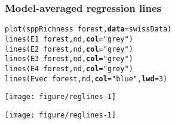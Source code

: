\documentclass[color=usenames,dvipsnames]{beamer}\usepackage[]{graphicx}\usepackage[]{color}
\makeatletter
\def\maxwidth{ %
  \ifdim\Gin@nat@width>\linewidth
    \linewidth
  \else
    \Gin@nat@width
  \fi
}
\newcommand{\hlnum}[1]{\textcolor[rgb]{0.69,0.494,0}{#1}}%
\newcommand{\hlstr}[1]{\textcolor[rgb]{0.749,0.012,0.012}{#1}}%
\newcommand{\hlopt}[1]{\textcolor[rgb]{0,0,0}{#1}}%
\newcommand{\hlstd}[1]{\textcolor[rgb]{0,0,0}{#1}}%
\newcommand{\hlkwc}[1]{\textcolor[rgb]{0,0,0}{\textbf{#1}}}%
\newcommand{\hlkwd}[1]{\textcolor[rgb]{0.004,0.004,0.506}{#1}}%
\newenvironment{kframe}{%
 \def\at@end@of@kframe{}%
 \ifinner\ifhmode%
  \def\at@end@of@kframe{\end{minipage}}%
  \begin{minipage}{\columnwidth}%
 \fi\fi%
 \def\FrameCommand##1{\hskip\@totalleftmargin \hskip-\fboxsep
 \colorbox{shadecolor}{##1}\hskip-\fboxsep
     \hskip-\linewidth \hskip-\@totalleftmargin \hskip\columnwidth}%
 \MakeFramed {\advance\hsize-\width
   \@totalleftmargin\z@ \linewidth\hsize
   \@setminipage}}%
 {\par\unskip\endMakeFramed%
 \at@end@of@kframe}
\newenvironment{knitrout}{}{} %
\makeatother
\begin{document}
\begin{frame}[fragile]
  \frametitle{Model-averaged regression lines}
  \tiny
\begin{knitrout}
\color{fgcolor}\begin{kframe}
\begin{alltt}
\hlkwd{plot}\hlstd{(sppRichness} \hlopt{~} \hlstd{forest,} \hlkwc{data}\hlstd{=swissData)}
\hlkwd{lines}\hlstd{(E1} \hlopt{~} \hlstd{forest, nd,} \hlkwc{col}\hlstd{=}\hlstr{"grey"}\hlstd{)}
\hlkwd{lines}\hlstd{(E2} \hlopt{~} \hlstd{forest, nd,} \hlkwc{col}\hlstd{=}\hlstr{"grey"}\hlstd{)}
\hlkwd{lines}\hlstd{(E3} \hlopt{~} \hlstd{forest, nd,} \hlkwc{col}\hlstd{=}\hlstr{"grey"}\hlstd{)}
\hlkwd{lines}\hlstd{(E4} \hlopt{~} \hlstd{forest, nd,} \hlkwc{col}\hlstd{=}\hlstr{"grey"}\hlstd{)}
\hlkwd{lines}\hlstd{(Evec} \hlopt{~} \hlstd{forest, nd,} \hlkwc{col}\hlstd{=}\hlstr{"blue"}\hlstd{,} \hlkwc{lwd}\hlstd{=}\hlnum{3}\hlstd{)}
\end{alltt}
\end{kframe}
\texttt{[image: figure/reglines-1]} 

\end{knitrout}
\begin{center}
  \texttt{[image: figure/reglines-1]}
\end{center}
\end{frame}












\end{document}
